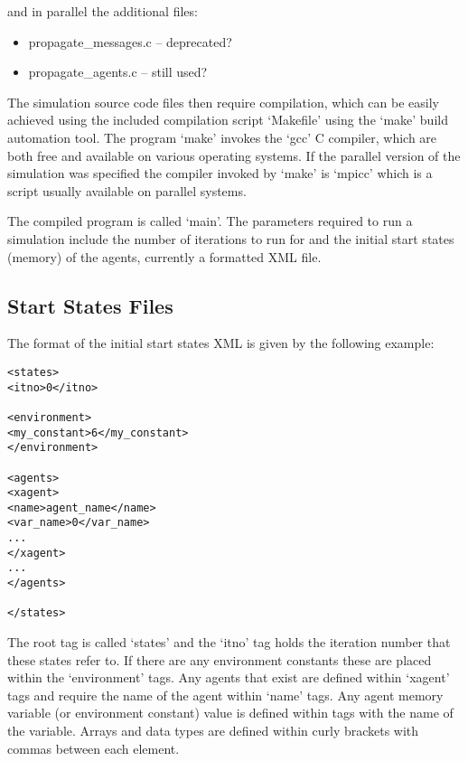 and in parallel the additional files:

\begin{itemize}
  \item propagate\_messages.c -- deprecated?
  \item propagate\_agents.c -- still used?
\end{itemize}

The simulation source code files then require compilation, which can be easily
achieved using the included compilation script `Makefile' using the `make'
build automation tool. The program `make' invokes the `gcc' C compiler, which
are both free and available on various operating systems. If the parallel
version of the simulation was specified the compiler invoked by `make' is
`mpicc' which is a script usually available on parallel systems.

The compiled program is called `main'. The parameters required to run a
simulation include the number of iterations to run for and the initial start
states (memory) of the agents, currently a formatted XML file.

\subsection{Start States Files}

The format of the initial start states XML is given by the following example:

\begin{mylisting}
\begin{verbatim}
<states>
<itno>0</itno>

<environment>
<my_constant>6</my_constant>
</environment>

<agents>
<xagent>
<name>agent_name</name>
<var_name>0</var_name>
...
</xagent>
...
</agents>

</states>
\end{verbatim}
\end{mylisting}

The root tag is called `states' and the `itno' tag holds the iteration number
that these states refer to. If there are any environment constants these are
placed within the `environment' tags. Any agents that exist are defined within
`xagent' tags and require the name of the agent within `name' tags. Any agent
memory variable (or environment constant) value is defined within tags with
the name of the variable. Arrays and data types are defined within curly
brackets with commas between each element.

